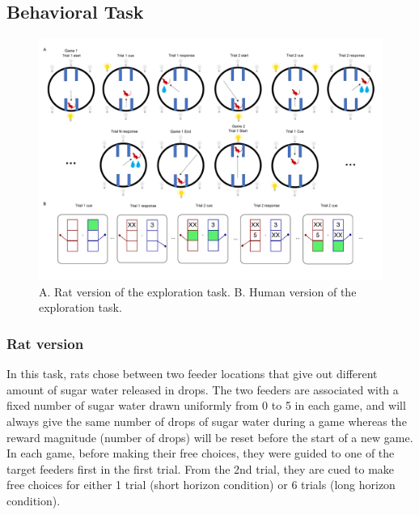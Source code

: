 \documentclass[12pt]{article}
\begin{document}
\subsection*{Behavioral Task}  
\begin{figure}[H]
	\begin{center}
			\includegraphics[width=1\textwidth]{figs/taskfigure.pdf}
			\caption{A. Rat version of the exploration task. B. Human version of the exploration task. }
			\label{fig:task}
	\end{center}
\end{figure}
\subsubsection*{Rat version}
In this task, rats chose between two feeder locations that give out different amount of sugar water released in drops. The two feeders are associated with a fixed number of sugar water drawn uniformly from 0 to 5 in each game, and will always give the same number of drops of sugar water during a game whereas the reward magnitude (number of drops) will be reset before the start of a new game. In each game, before making their free choices, they were guided to one of the target feeders first in the first trial. From the 2nd trial, they are cued to make free choices for either 1 trial (short horizon condition) or 6 trials (long horizon condition). 
\end{document}

